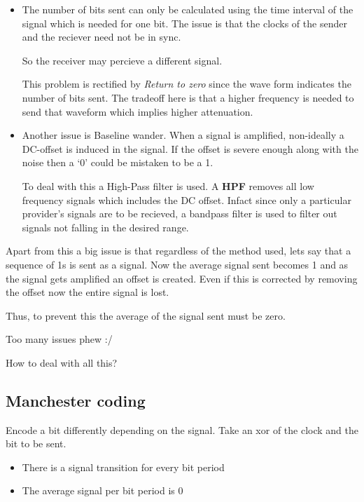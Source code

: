\documentclass[12pt]{article}
\begin{document}
\begin{itemize}
\item The number of bits sent can only be calculated using the time interval of 
the signal which is needed for one bit. The issue is that the clocks of the sender and the reciever need not be in sync. 

So the receiver may percieve a different signal. 

This problem is rectified by \textit{Return to zero} since the wave form indicates the number of bits sent.
The tradeoff here is that a higher frequency is needed to send that waveform which implies higher attenuation. 


\item Another issue is Baseline wander. When a signal is amplified, non-ideally 
a DC-offset is induced in the signal. If the offset is severe enough along with the noise then 
a `0' could be mistaken to be a 1. 

To deal with this a High-Pass filter is used. A \textbf{HPF} removes all low frequency signals
which includes the DC offset. Infact since only a particular provider's signals are to be recieved, a bandpass filter is 
used to filter out signals not falling in the desired range.   
\end{itemize}

Apart from this a big issue is that regardless of the method used, lets say that a sequence of 1s is sent as a signal. 
Now the average signal sent becomes 1 and as the signal gets amplified 
an offset is created. Even if this is corrected by removing the offset now the entire signal is lost. 

Thus, to prevent this the average of the signal sent must be zero. 


Too many issues phew :/

How to deal with all this?

\subsection{Manchester coding}

Encode a bit differently depending on the signal. Take an xor of the 
clock and the bit to be sent. 


\begin{itemize}
    \item There is a signal transition for every bit period
    \item The average signal per bit period is 0
\end{itemize}
\end{document}
